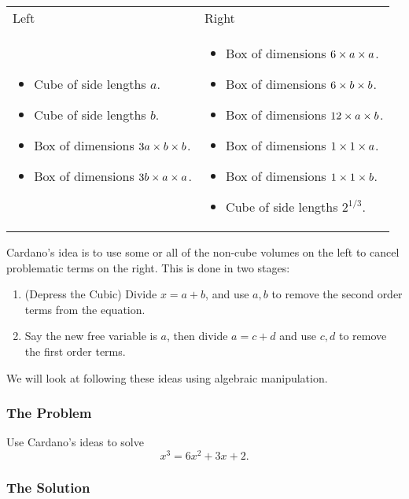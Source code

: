 \begin{tabular}{p{} | p{}}
    Left & Right \\
    \begin{itemize}
    \item Cube of side lengths \(a\).
    \item Cube of side lengths \(b\).
    \item Box of dimensions \({3a} \times {b} \times {b}\).
    \item Box of dimensions \({3b} \times {a} \times {a}\).
    \end{itemize}
    
    & 
    
    \begin{itemize}
    \item Box of dimensions \({6} \times {a} \times {a}\).
    \item Box of dimensions \({6} \times {b} \times {b}\).
    \item Box of dimensions \({12} \times {a} \times {b}\).
    \item Box of dimensions \({1} \times {1} \times {a}\).
    \item Box of dimensions \({1} \times {1} \times {b}\).
    \item Cube of side lengths \(2^{1/3}\). 
    \end{itemize}
\end{tabular}

Cardano's idea is to use some or all of the non-cube volumes on the left to cancel problematic terms on the right.
This is done in two stages:
\begin{enumerate}
\item (Depress the Cubic) Divide \(x = a + b\), and use \(a,b\) to remove the second order terms from the equation.
\item Say the new free variable is \(a\), then divide \(a = c + d\) and use \(c,d\) to remove the first order terms. 
\end{enumerate} 
We will look at following these ideas using algebraic manipulation.

\subsubsection*{The Problem}
Use Cardano's ideas to solve 
\begin{equation}
x^3 = 6x^2 + 3x + 2.
\end{equation}

\subsubsection*{The Solution}

